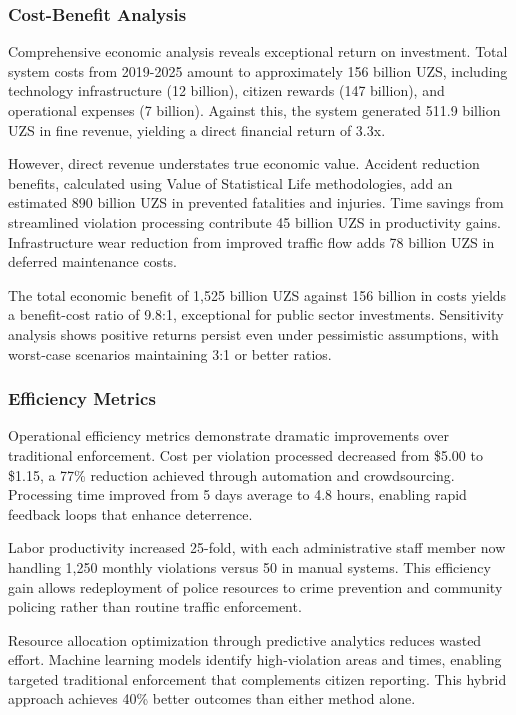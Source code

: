 \documentclass[pdflatex,sn-mathphys-num]{sn-jnl}%
\theoremstyle{thmstyleone}%
\theoremstyle{thmstyletwo}%
\theoremstyle{thmstylethree}%
\begin{document}
\subsubsection{Cost-Benefit Analysis}

Comprehensive economic analysis reveals exceptional return on investment. Total system costs from 2019-2025 amount to approximately 156 billion UZS, including technology infrastructure (12 billion), citizen rewards (147 billion), and operational expenses (7 billion). Against this, the system generated 511.9 billion UZS in fine revenue, yielding a direct financial return of 3.3x.

However, direct revenue understates true economic value. Accident reduction benefits, calculated using Value of Statistical Life methodologies, add an estimated 890 billion UZS in prevented fatalities and injuries. Time savings from streamlined violation processing contribute 45 billion UZS in productivity gains. Infrastructure wear reduction from improved traffic flow adds 78 billion UZS in deferred maintenance costs.

The total economic benefit of 1,525 billion UZS against 156 billion in costs yields a benefit-cost ratio of 9.8:1, exceptional for public sector investments. Sensitivity analysis shows positive returns persist even under pessimistic assumptions, with worst-case scenarios maintaining 3:1 or better ratios.

\subsubsection{Efficiency Metrics}

Operational efficiency metrics demonstrate dramatic improvements over traditional enforcement. Cost per violation processed decreased from \$5.00 to \$1.15, a 77\% reduction achieved through automation and crowdsourcing. Processing time improved from 5 days average to 4.8 hours, enabling rapid feedback loops that enhance deterrence.

Labor productivity increased 25-fold, with each administrative staff member now handling 1,250 monthly violations versus 50 in manual systems. This efficiency gain allows redeployment of police resources to crime prevention and community policing rather than routine traffic enforcement.

Resource allocation optimization through predictive analytics reduces wasted effort. Machine learning models identify high-violation areas and times, enabling targeted traditional enforcement that complements citizen reporting. This hybrid approach achieves 40\% better outcomes than either method alone.
\end{document}
